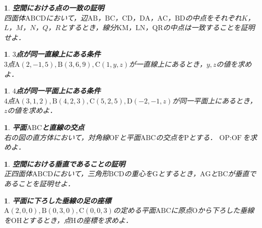 \documentclass[10pt,
fleqn,
dvipdfmx,
uplatex
]{jsarticle}
\newtheorem{question}[Question]{}
\begin{document}
\begin{question}{\bf\boldmath 空間における点の一致の証明}\\
四面体$\text{ABCD}$において，辺$\text{AB}$，$\text{BC}$，$\text{CD}$，$\text{DA}$，$\text{AC}$，$\text{BD}$の中点をそれぞれ$K$，$L$，$M$，$N$，$Q$，$R$とするとき，線分$\text{KM}$，$\text{LN}$，$\text{QR}$の中点は一致することを証明せよ．
\end{question}



\begin{question}{\bf\boldmath $3$点が同一直線上にある条件}\\
$3$点$\text{A}\left(2, -1, 5\right), \text{B}\left(3, 6, 9\right), \text{C}\left(1, y, z\right)$が一直線上にあるとき，$y, z$の値を求めよ．
\end{question}



\begin{question}{\bf\boldmath $4$点が同一平面上にある条件}\\
$4$点$\text{A}\left(3, 1, 2\right), \text{B}\left(4, 2, 3\right), \text{C}\left(5, 2, 5\right), \text{D}\left(-2, -1, z\right)$が同一平面上にあるとき，$z$の値を求めよ．
\end{question}



\begin{question}{\bf\boldmath 平面$\text{ABC}$と直線の交点}\\
右の図の直方体において，対角線$\text{OF}$と平面$\text{ABC}$の交点を$\text{P}$とする．
$\text{OP}:\text{OF}$を求めよ．
\end{question}



\begin{question}{\bf\boldmath 空間における垂直であることの証明}\\
正四面体$\text{ABCD}$において，三角形$\text{BCD}$の重心を$\text{G}$とするとき，$\text{AG}$と$\text{BC}$が垂直であることを証明せよ．
\end{question}



\begin{question}{\bf\boldmath 平面に下ろした垂線の足の座標}\\
$\text{A}\left(2,0,0\right), \text{B}\left(0,3,0\right), \text{C}\left(0,0,3\right)$の定める平面$\text{ABC}$に原点$\text{O}$から下ろした垂線を$\text{OH}$とするとき，点$\text{H}$の座標を求めよ．
\end{question}
\end{document}
